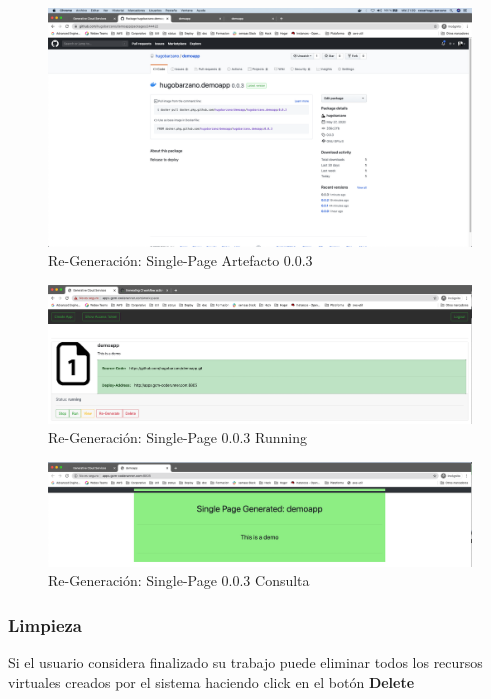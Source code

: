 \documentclass[a4paper,11pt]{book}
\begin{document}
   \begin{figure}[H]
\centering
\includegraphics[scale=0.2]{imagenes/casouso/4_7.png}
\caption{  Re-Generación: Single-Page Artefacto 0.0.3 }
\end{figure}


   \begin{figure}[H]
\centering
\includegraphics[scale=0.25]{imagenes/casouso/4_8_a.png}
\caption{  Re-Generación: Single-Page 0.0.3 Running }
\end{figure}


   \begin{figure}[H]
\centering
\includegraphics[scale=0.25]{imagenes/casouso/4_9_a.png}
\caption{ Re-Generación: Single-Page 0.0.3 Consulta  }
\end{figure}

\subsubsection{Limpieza}

Si el usuario considera finalizado su trabajo puede eliminar todos los recursos virtuales creados por el sistema haciendo click en el botón \textbf{Delete}
\end{document}
